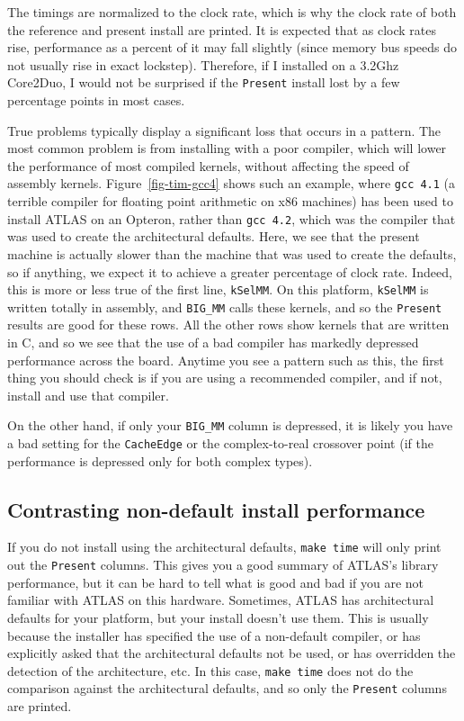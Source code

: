 \documentclass[11pt]{article}
\begin{document}
The timings are normalized to the clock rate, which is why the clock rate
of both the reference and present install are printed.  It is expected that
as clock rates rise, performance as a percent of it may fall slightly
(since memory bus speeds do not usually rise in exact lockstep).  Therefore,
if I installed on a 3.2Ghz Core2Duo, I would not be surprised if the 
{\tt Present} install lost by a few percentage points in most cases.

True problems typically display a significant loss that occurs in a pattern.
The most common problem is from installing with a poor compiler, which will
lower the performance of most compiled kernels, without affecting the speed
of assembly kernels.  Figure~\ref{fig-tim-gcc4} shows 
such an example, where {\tt gcc 4.1} (a terrible
compiler for floating point arithmetic on x86 machines) has been used to
install ATLAS on an Opteron, rather than {\tt gcc 4.2}, which was the compiler
that was used to create the architectural defaults.
Here, we see that the present machine is actually slower than the machine
that was used to create the defaults, so if anything, we expect it to
achieve a greater percentage of clock rate.  Indeed, this is more or less
true of the first line, {\tt kSelMM}.  On this platform, {\tt kSelMM} is
written totally in assembly, and {\tt BIG\_MM} calls these kernels,
and so the {\tt Present} results are good for these rows.  All the other
rows show kernels that are written in C, and so we see that the use of
a bad compiler has markedly depressed performance across the board.  
Anytime you see a pattern such as this, the first thing you should check
is if you are using a recommended compiler, and if not, install and use
that compiler.

On the other hand, if only your {\tt BIG\_MM} column is depressed, it is
likely you have a bad setting for the {\tt CacheEdge} or the complex-to-real
crossover point (if the performance is depressed only for both complex types).

\subsection{Contrasting non-default install performance}
\label{sec-time-nondefault}
If you do not install using the architectural defaults, {\tt make time} will
only print out the {\tt Present} columns.  This gives you a good summary of
ATLAS's library performance, but it can be hard to tell what is good and
bad if you are not familiar with ATLAS on this hardware.  Sometimes, ATLAS
has architectural defaults for your platform, but your install doesn't use
them.  This is usually because the installer has specified the use of a
non-default compiler, or has explicitly asked that the architectural defaults
not be used, or has overridden the detection of the architecture, etc.  In
this case, {\tt make time} does not do the comparison
against the architectural defaults, and so only the {\tt Present} columns
are printed.
\end{document}
